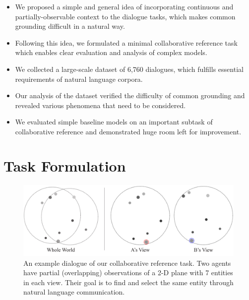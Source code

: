 \begin{itemize}
  \item We proposed a simple and general idea of incorporating continuous and partially-observable context to the dialogue tasks, which makes common grounding difficult in a natural way.
  \item Following this idea, we formulated a minimal collaborative reference task which enables clear evaluation and analysis of complex models.
  \item We collected a large-scale dataset of 6,760 dialogues, which fulfills essential requirements of natural language corpora.
  \item Our analysis of the dataset verified the difficulty of common grounding and revealed various phenomena that need to be considered.
  \item We evaluated simple baseline models on an important subtask of collaborative reference and demonstrated huge room left for improvement.
\end{itemize}

\section{Task Formulation}
\label{03_sec:task_formulation}


\begin{figure}[th!]
\center
\includegraphics[width=\columnwidth]{onecommon_example.pdf}
\caption{An example dialogue of our collaborative reference task. Two agents have partial (overlapping) observations of a 2-D plane with 7 entities in each view. Their goal is to find and select the same entity through natural language communication.
}
\label{03_fig:onecommon_dialog}
\end{figure}

